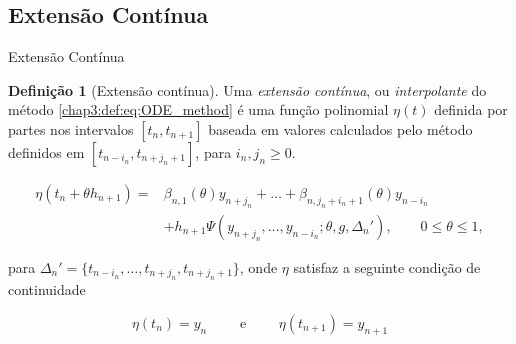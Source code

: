 \documentclass{beamer}
\theoremstyle{plain}
\theoremstyle{definition}
\newtheorem{defi}{Definição}
\begin{document}
\subsection{Extensão Contínua}
\begin{frame}{Extensão Contínua}


    \small
    \begin{defi}[Extensão contínua]
        Uma \textit{extensão contínua}, ou \textit{interpolante} do método \eqref{chap3:def:eq:ODE_method} é uma função polinomial $\eta(t)$ definida por partes nos intervalos $[t_n, t_{n+1}]$ baseada em valores calculados pelo método definidos em $[t_{n - i_n}, t_{n+j_n + 1}]$, para $i_n, j_n \geq 0$. 

        \scriptsize
        \begin{equation}
            \begin{split}
                \eta(t_n + \theta h_{n+1}) = &\beta_{n, 1} (\theta) y_{n + j_n} + \dots + \beta_{n, j_n + i_n + 1}(\theta) y_{n - i_n} \\
                                             &+ h_{n+1} \Psi(y_{n+j_n}, \dots, y_{n-i_n}; \theta, g, \Delta _n '), \qquad 0 \leq \theta \leq 1,
                                             \label{chap3:def:eq:Interpolant_extension}
            \end{split}
        \end{equation}

        \noindent
        \normalsize
        para $\Delta _n ' = \{ t_{n - i_n} , \dots, t_{n+j_n}, t_{n +j_n + 1} \}$, onde $\eta$ satisfaz a seguinte condição de continuidade

        \scriptsize
        \begin{equation}
            \eta(t_n) = y_n \qquad  \text{ e } \qquad \eta(t_{n+1}) = y_{n+1}
            \label{chap3:def:eq:continuity_condition}
        \end{equation}

    \end{defi}

\end{frame}
 

\end{document}
